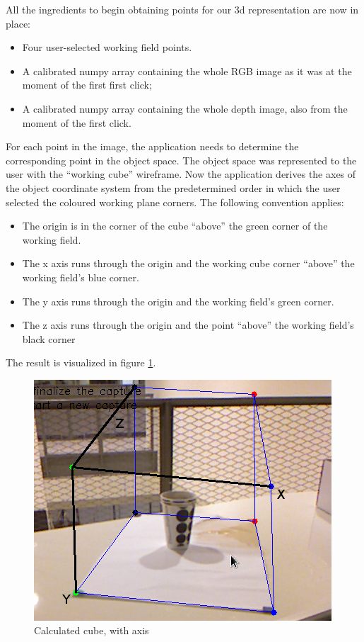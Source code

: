 All the ingredients to begin obtaining points for our 3d representation are now
in place:
\begin{itemize}

\item Four user-selected working field points.

\item A calibrated numpy array containing the whole RGB image as it was at the
moment of the first first click;

\item A calibrated numpy array containing the whole depth image, also from the
moment of the first click.

\end{itemize}

For each point in the image, the application needs to determine the
corresponding point in the object space. The object space was represented to the
user with the ``working cube'' wireframe. Now the application derives the axes
of the object coordinate system from the predetermined order in which the user
selected the coloured working plane corners. The following convention applies:
\begin{itemize}

\item The origin is in the corner of the cube ``above'' the green corner of the
working field.

\item The x axis runs through the origin and the working cube corner ``above'' the
working field's blue corner.

\item The y axis runs through the origin and the working field's green corner.

\item The z axis runs through the origin and the point ``above'' the working
field's black corner

\end{itemize}

The result is visualized in figure \ref{fig:axis}.

\begin{figure}[H]
\centering
\includegraphics[scale=0.5]{images/axis.png}
\caption{Calculated cube, with axis}
\label{fig:axis}
\end{figure}

